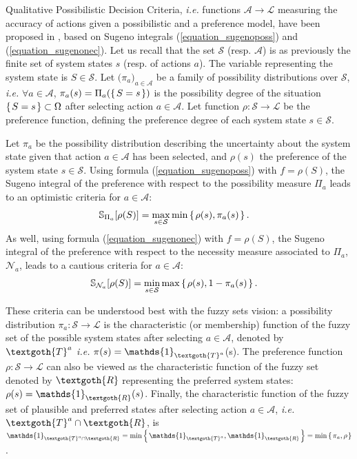 Qualitative Possibilistic Decision Criteria,
\textit{i.e.} functions $\mathcal{A} \rightarrow \mathcal{L}$ 
measuring the accuracy of actions given a possibilistic and a preference model,
have been proposed in \cite{DBLP:journals/ijar/SabbadinFL98,DBLP:journals/eor/DuboisPS01,Dubois95possibilitytheory},
based on Sugeno integrals (\ref{equation_sugenoposs}) and (\ref{equation_sugenonec}).
Let us recall that the set $\mathcal{S}$ (resp. $\mathcal{A}$) 
is as previously the finite set of system states $s$ (resp. of actions $a$).
The variable representing the system state is $S \in \mathcal{S}$.
Let $\big(\pi_a\big)_{a \in \mathcal{A}}$ be a family of 
possibility distributions over $\mathcal{S}$,
\textit{i.e.} $\forall a \in \mathcal{A}$, $\pi_a(s) = \Pi_a( \left\{ \left. S = s \right. \right\} )$
is the possibility degree of the situation $\left\{ \left. S=s \right. \right\} \subset \Omega$ after selecting action $a \in \mathcal{A}$. 
Let function $\rho: \mathcal{S} \rightarrow \mathcal{L}$ be the preference function, 
defining the preference degree of each system state $s \in \mathcal{S}$.

\begin{Def}
Let $\pi_a$ be the possibility distribution 
describing the uncertainty about the system state
given that action $a \in \mathcal{A}$ has been selected, 
and $\rho(s)$ the preference of the system state $s \in \mathcal{S}$.
Using formula (\ref{equation_sugenoposs}) with $f=\rho(S)$, 
the Sugeno integral of the preference with respect to the possibility measure $\Pi_a$ 
leads to an optimistic criteria for $a \in \mathcal{A}$:
\label{def_qualcrit}
\begin{align}
\label{equation_critopt} \mathbb{S}_{\Pi_a}[\rho(S)] &= \max_{s \in \mathcal{S}} \min \left\{ \left.  \rho(s), \pi_a(s)  \right. \right\}.
\end{align}
As well, using formula (\ref{equation_sugenonec}) with $f=\rho(S)$, 
the Sugeno integral of the preference with respect to the necessity measure associated to $\Pi_a$, $\mathcal{N}_a$, 
leads to a cautious criteria for $a \in \mathcal{A}$:
\begin{align}
\label{equation_critpess} \mathbb{S}_{\mathcal{N}_a}[\rho(S)] &= \min_{s \in \mathcal{S}} \max \left\{ \left.  \rho(s), 1-\pi_a(s)  \right. \right\}.
\end{align}
\end{Def}

These criteria can be understood best with the fuzzy sets vision:
a possibility distribution $\pi_a: \mathcal{S} \rightarrow \mathcal{L}$ 
is the characteristic (or membership) function of the fuzzy set of the possible system states 
after selecting $a \in \mathcal{A}$,
denoted by $\textgoth{T}^{a}$ \textit{i.e.} $\pi(s) = \mathds{1}_{\textgoth{T}^a}$(s).
The preference function $\rho: \mathcal{S} \rightarrow \mathcal{L}$ 
can also be viewed as the characteristic function 
of the fuzzy set denoted by $\textgoth{R}$ representing the preferred system states:
$\rho(s) = \mathds{1}_{\textgoth{R}}(s)$.
Finally, the characteristic function of the fuzzy set 
of plausible and preferred states after selecting action $a \in \mathcal{A}$, \textit{i.e.} $\textgoth{T}^a \cap \textgoth{R}$,
is $\mathds{1}_{\textgoth{T}^a \cap \textgoth{R}} = \min \set{ \mathds{1}_{\textgoth{T}^a}, \mathds{1}_{\textgoth{R}} }
= \min \set{ \pi_a, \rho }$.

